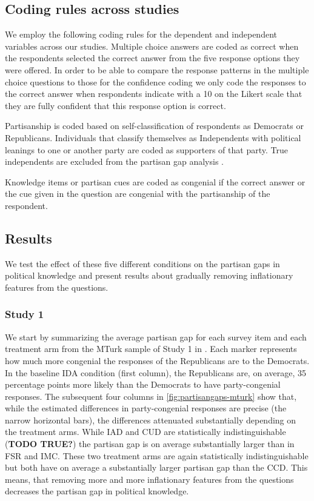 \documentclass[12pt, letterpaper]{article}
\begin{document}
\subsection*{Coding rules across studies}


We employ the following coding rules for the dependent and independent variables across our studies. Multiple choice answers are coded as correct when the respondents selected the correct answer from the five response options they were offered. In order to be able to compare the response patterns in the multiple choice questions to those for the confidence coding we only code the responses to the correct answer when respondents indicate with a 10 on the Likert scale that they are fully confident that this response option is correct.

Partisanship is coded based on self-classification of respondents as Democrats or Republicans. Individuals that classify themselves as Independents with political leanings to one or another party are coded as supporters of that party. True independents are excluded from the partisan gap analysis \citep{Bullock2011, klar2016independent}.

Knowledge items or partisan cues are coded as congenial if the correct answer or the cue given in the question are congenial with the partisanship of the respondent.

\subsection*{Results}
We test the effect of these five different conditions on the partisan gaps in political knowledge and present results about gradually removing inflationary features from the questions.


\subsubsection*{Study 1}
We start by summarizing the average partisan gap for each survey item and each treatment arm from the MTurk sample of Study 1 in . Each marker represents how much more congenial the responses of the Republicans are to the Democrats. In the baseline IDA condition (first column), the Republicans are, on average, 35 percentage points more likely than the Democrats to have party-congenial responses. The subsequent four columns in \cref{fig:partisangaps-mturk} show that, while the estimated differences in party-congenial responses are precise (the narrow horizontal bars), the differences attenuated substantially depending on the treatment arms. While IAD and CUD are statistically indistinguishable (\textbf{TODO TRUE?}) the partisan gap is on average substantially larger than in FSR and IMC. These two treatment arms are again statistically indistinguishable but both have on average a substantially larger partisan gap than the CCD. This means, that removing more and more inflationary features from the questions decreases the partisan gap in political knowledge.
\end{document}
